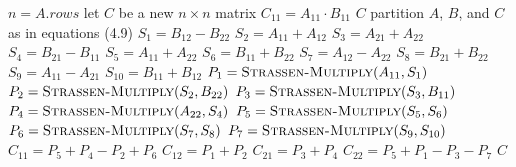 \begin{algorithmic}[1]
  \STATE $n = A.\mathit{rows}$
  \STATE let $C$ be a new $n \times n$ matrix
  \STATE $C_{11} = A_{11} \cdot B_{11}$
  \RETURN $C$
  \ELSE
  \STATE partition $A$, $B$, and $C$ as in equations (4.9)
  \STATE $S_1 = B_{12} - B_{22}$
  \STATE $S_2 = A_{11} + A_{12}$
  \STATE $S_3 = A_{21} + A_{22}$
  \STATE $S_4 = B_{21} - B_{11}$
  \STATE $S_5 = A_{11} + A_{22}$
  \STATE $S_6 = B_{11} + B_{22}$
  \STATE $S_7 = A_{12} - A_{22}$
  \STATE $S_8 = B_{21} + B_{22}$
  \STATE $S_9 = A_{11} - A_{21}$
  \STATE $S_{10} = B_{11} + B_{12}$
  \STATE $P_1 = \textsc{Strassen-Multiply}(A_{11}, S_1)$
  \STATE $P_2 = \textsc{Strassen-Multiply}(S_2, B_{22})$
  \STATE $P_3 = \textsc{Strassen-Multiply}(S_3, B_{11})$
  \STATE $P_4 = \textsc{Strassen-Multiply}(A_{22}, S_4)$
  \STATE $P_5 = \textsc{Strassen-Multiply}(S_5, S_6)$
  \STATE $P_6 = \textsc{Strassen-Multiply}(S_7, S_8)$
  \STATE $P_7 = \textsc{Strassen-Multiply}(S_9, S_{10})$
  \STATE $C_{11} = P_5 + P_4 - P_2 + P_6$
  \STATE $C_{12} = P_1 + P_2$
  \STATE $C_{21} = P_3 + P_4$
  \STATE $C_{22} = P_5 + P_1 - P_3 - P_7$
  \RETURN $C$
  \ENDIF
\end{algorithmic}
